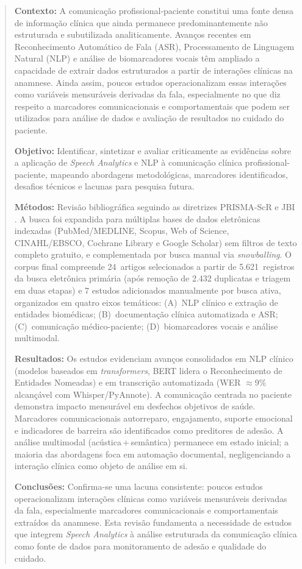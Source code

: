 \documentclass[a4paper,fleqn]{cas-sc}
\begin{document}
\begin{abstract}
\textbf{Contexto:}
A comunicação profissional-paciente constitui uma fonte densa de informação
clínica que ainda permanece predominantemente não estruturada e subutilizada
analiticamente. Avanços recentes em Reconhecimento Automático de Fala (ASR),
Processamento de Linguagem Natural (NLP) e análise de biomarcadores vocais
têm ampliado a capacidade de extrair dados estruturados a partir de interações
clínicas na anamnese. Ainda assim, poucos estudos operacionalizam essas
interações como variáveis mensuráveis derivadas da fala, especialmente no que
diz respeito a marcadores comunicacionais e comportamentais que podem ser
utilizados para análise de dados e avaliação de resultados no cuidado do
paciente.

\textbf{Objetivo:}
Identificar, sintetizar e avaliar criticamente as evidências sobre a aplicação
de \textit{Speech Analytics} e NLP à comunicação clínica profissional-paciente,
mapeando abordagens metodológicas, marcadores identificados, desafios técnicos
e lacunas para pesquisa futura.

\textbf{Métodos:}
Revisão bibliográfica seguindo as diretrizes PRISMA-ScR \citep{Tricco2018}
e JBI \citep{Peters2020}. A busca foi expandida para múltiplas bases de dados eletrônicas indexadas (PubMed/MEDLINE, Scopus, Web of Science, CINAHL/EBSCO, Cochrane Library e Google Scholar) sem filtros de texto completo gratuito, e complementada por busca manual via \textit{snowballing}. O corpus final compreende 24~artigos selecionados a partir de 5.621~registros da busca eletrônica primária (após remoção de 2.432 duplicatas e triagem em duas etapas) e 7 estudos adicionados manualmente por busca ativa, organizados em quatro eixos temáticos: (A)~NLP clínico e extração de entidades
biomédicas; (B)~documentação clínica automatizada e ASR;
(C)~comunicação médico-paciente; (D)~biomarcadores vocais e análise multimodal.

\textbf{Resultados:}
Os estudos evidenciam avanços consolidados em NLP clínico (modelos baseados
em \textit{transformers}, BERT lidera o Reconhecimento de Entidades Nomeadas)
e em transcrição automatizada (WER $\approx$9\% alcançável com
Whisper/PyAnnote). A comunicação centrada no paciente demonstra impacto
mensurável em desfechos objetivos de saúde. Marcadores comunicacionais autorreparo,
engajamento, suporte emocional e indicadores de barreira são identificados
como preditores de adesão. A análise multimodal
(acústica\,+\,semântica) permanece em estado inicial; a maioria das
abordagens foca em automação documental, negligenciando a interação clínica
como objeto de análise em si.

\textbf{Conclusões:}
Confirma-se uma lacuna consistente: poucos estudos operacionalizam interações
clínicas como variáveis mensuráveis derivadas da fala, especialmente
marcadores comunicacionais e comportamentais extraídos da anamnese. Esta
revisão fundamenta a necessidade de estudos que integrem \textit{Speech
Analytics} à análise estruturada da comunicação clínica como fonte de dados
para monitoramento de adesão e qualidade do cuidado.

\end{abstract}
\end{document}
